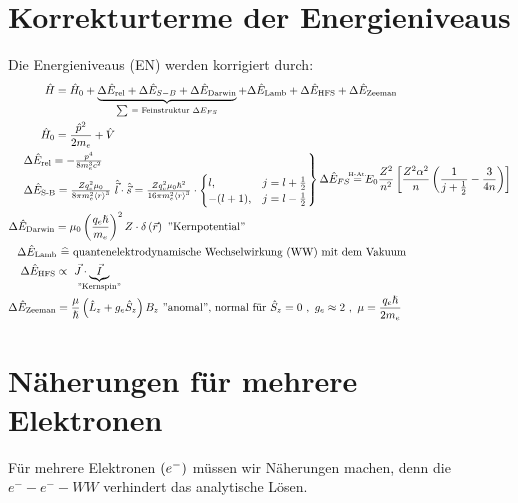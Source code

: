 \documentclass[Ex4_Zusammenfassung.tex]{subfiles}
\begin{document}
\section{Korrekturterme der Energieniveaus}
Die Energieniveaus (EN) werden korrigiert durch:
\begin{align*}
	\hat{H} &= \hat{H}_0 + \underbrace{ \Delta \hat{E}_{\text{rel}} + \Delta \hat{E}_{S-B} + \Delta \hat{E}_{\text{Darwin}} }_{\mathclap{\sum\ = \text{ Feinstruktur } \Delta E_{FS}} } + \Delta \hat{E}_{\text{Lamb}} + \Delta \hat{E}_{\text{HFS}} + \Delta \hat{E}_{\text{Zeeman}}\\
	\hat{H}_0 &= \frac{\hat{p}^2}{2m_e} + \hat{V}\\
	& \kern -3.1em \begin{rcases}
	\Delta \hat{E}_{\text{rel}} = - \frac{p^4}{8 m_e^3 c^2} \\
		\Delta \hat{E}_{\text{S-B}} = \frac{Z q_e^2 \mu_0}{8 \pi m_e^2 \braket{r}^3}\ \hat{\vec{l}} \cdot \hat{\vec{s}} = \frac{Z q_e^2 \mu_0 \hslash^2}{16 \pi m_e^2 \braket{r}^3} \cdot 
			\begin{cases}
				l,&  j=l+\frac{1}{2}\\
				-(l+1) ,& j=l-\frac{1}{2}
			\end{cases} 
	\end{rcases}
	\Delta \hat{E}_{FS} \stackrel{\mathclap{\text{\tiny{H-At.}}}}{=} E_0 \frac{Z^2}{n^2} \left[ \frac{Z^2 \alpha^2}{n} \lp \frac{1}{j+\frac{1}{2}} - \frac{3}{4n} \rp  \right] \\
	\Delta \hat{E}_{\text{Darwin}} &= \mu_0 \lp \frac{q_e \hslash}{m_e} \rp^2 Z \cdot \delta\lp \vec{r} \rp\  \text{''Kernpotential''}\\
	& \kern -3.4em \Delta \hat{E}_{\text{Lamb}}\  \widehat{=} \text{ quantenelektrodynamische Wechselwirkung (WW) mit dem Vakuum}\\
	& \kern -3.1em \Delta \hat{E}_{\text{HFS}} \propto\ \vec{J} \cdot \underbrace{\vec{I}}_{\mathclap{\text{''Kernspin''}}}\\
	& \kern -4.2em \Delta \hat{E}_{\text{Zeeman}} = \frac{\mu}{\hslash} \lp \hat{L}_z + g_e \hat{S}_z \rp B_z\ \text{''anomal'', normal für } \hat{S}_z = 0\ ,\ g_e \approx 2\ ,\ \mu = \frac{q_e \hslash}{2m_e}
\end{align*}

\section{Näherungen für mehrere Elektronen}
Für mehrere Elektronen $ \left( e^- \right) $ müssen wir Näherungen machen, denn die $ e^- - e^- - WW$ verhindert das analytische Lösen. \\
\end{document}
